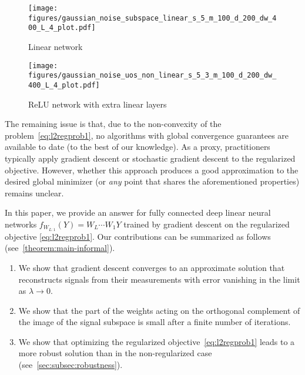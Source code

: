 \begin{figure*}[h]
	\centering
	\begin{subfigure}[b]{0.45\textwidth}
    \texttt{[image: figures/gaussian\_noise\_subspace\_linear\_s\_5\_m\_100\_d\_200\_dw\_400\_L\_4\_plot.pdf]}
		\caption{Linear network}
		\label{fig:linear}
	\end{subfigure}
	\begin{subfigure}[b]{0.45\textwidth}
		\texttt{[image: figures/gaussian\_noise\_uos\_non\_linear\_s\_5\_3\_m\_100\_d\_200\_dw\_400\_L\_4\_plot.pdf]}
		\caption{ReLU network with extra linear layers}
		\label{fig:nonlinear}
	\end{subfigure}
	\caption{
    Comparison of robustness against Gaussian noise for training with and without weight decay. All experiments use signals
    of dimension $\dout = 200$ and measurements of dimension $\din = 100$; all networks have $L = 5$ layers and hidden layer width
    $\dhid = 400$.
    In \cref{fig:linear}, 
    the model is a linear neural network trained on data 
    lying in a subspace of dimension $s=5$.
    In \cref{fig:nonlinear}, the model is a ReLU neural network with extra linear layers, similar to the setup of \citet{parkinson2023linear}, trained on data that lie in the union of three subspaces, each of dimension $s=5$. A detailed description of the numerical experiment can be found in \cref{sec:numerics,sec:appendix numerical description}.}
	\label{fig:gauss_noise_wd}
\end{figure*}

The remaining issue is that, due to the non-convexity of the problem~\eqref{eq:l2regprob1}, no algorithms with global convergence guarantees are available to date (to the best of our knowledge).
As a proxy, practitioners typically apply gradient descent or stochastic gradient descent to the regularized objective. However,
whether this approach produces a good approximation to the desired global minimizer (or \emph{any} point that shares the aforementioned properties)
remains unclear.

In this paper, we provide an answer for fully connected deep linear neural networks $f_{W_{L:1}}(Y) = W_L \cdots W_1 Y$ trained by gradient descent on the regularized objective \eqref{eq:l2regprob1}.
Our contributions can be summarized as follows (see~\cref{theorem:main-informal}).
\begin{enumerate}
	\item We show that gradient descent converges to an approximate solution that reconstructs signals from their measurements  with error vanishing in the limit as $\lambda \rightarrow 0$.
	\item We show that the part of the weights acting on the orthogonal complement of the image of the signal subspace is small after a finite number of iterations.
	\item We show that optimizing the regularized objective~\eqref{eq:l2regprob1} leads to a more robust solution than in the non-regularized case (see~\cref{sec:subsec:robustness}).
\end{enumerate}
